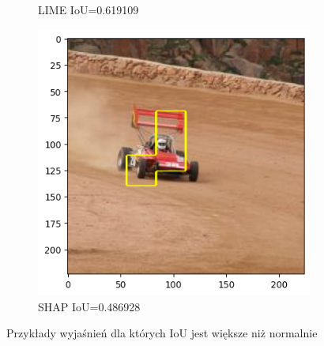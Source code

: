 \begin{figure}[h]
\begin{subfigure}[b]{0.3\textwidth}
		\caption{LIME IoU=0.619109}
	\end{subfigure}
	\begin{subfigure}[b]{0.3\textwidth}
		\includegraphics[width=.9\textwidth]{img/examples/appendix/n04037443_42773_shap}
		\caption{SHAP IoU=0.486928}
	\end{subfigure}
	\caption{Przykłady wyjaśnień dla których IoU jest większe niż normalnie}
\end{figure}
